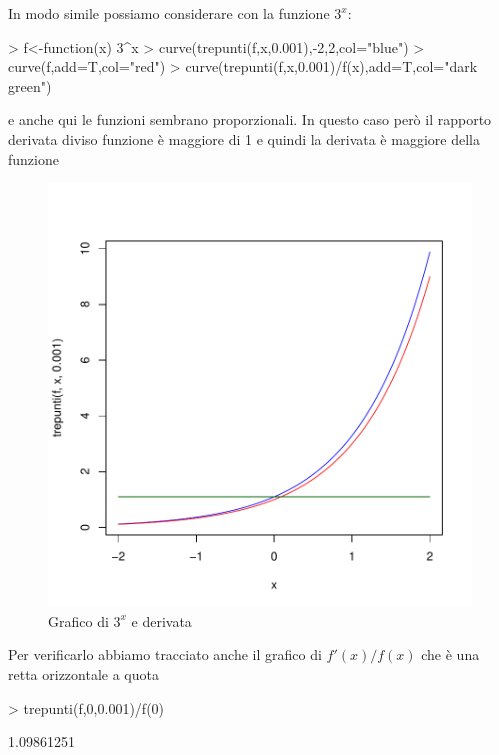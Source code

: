 \documentclass[onecolumn,11pt]{book}
\begin{document}
In modo simile possiamo considerare con la funzione $3^x$:
\begin{Schunk}
\begin{Sinput}
> f<-function(x) 3^x
> curve(trepunti(f,x,0.001),-2,2,col="blue")
> curve(f,add=T,col="red")
> curve(trepunti(f,x,0.001)/f(x),add=T,col="dark green")
\end{Sinput}
\end{Schunk}
e anche qui  le funzioni sembrano proporzionali. In questo caso per\`o il rapporto derivata diviso funzione \`e  maggiore di 1 e quindi la derivata \`e maggiore della funzione
\begin{figure}[ htbp]
\begin{center}
\includegraphics{RbookParte1-131}
\caption{Grafico di $3^x$ e derivata}
\label{fig:der3x}
\end{center}
\end{figure}

Per verificarlo abbiamo tracciato anche il grafico di $f'(x)/f(x)$ che \`e una retta orizzontale a quota
\begin{Schunk}
\begin{Sinput}
> trepunti(f,0,0.001)/f(0)
\end{Sinput}
\begin{Soutput}
[1] 1.09861251
\end{Soutput}
\end{Schunk}
\end{document}
